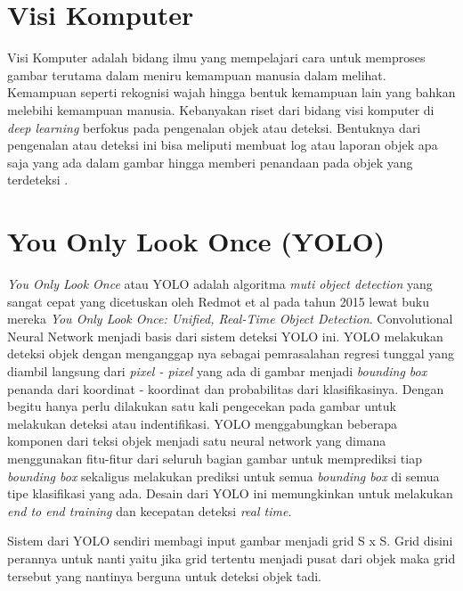 

\section{Visi Komputer}
\label{sec:visikomputer}

Visi Komputer adalah bidang ilmu yang mempelajari cara untuk memproses gambar terutama dalam meniru
kemampuan manusia dalam melihat. Kemampuan seperti rekognisi wajah hingga bentuk kemampuan lain yang bahkan
melebihi kemampuan manusia. Kebanyakan riset dari bidang visi komputer di \emph{deep learning} berfokus pada
pengenalan objek atau deteksi. Bentuknya dari pengenalan atau deteksi ini bisa meliputi membuat log atau laporan
objek apa saja yang ada dalam gambar hingga memberi penandaan pada objek yang terdeteksi \cite{Goodfellow-et-al-2016}. 

\section{You Only Look Once (YOLO)}
\label{sec:youonlylookone}

\emph{You Only Look Once} atau YOLO adalah algoritma \emph{muti object detection} yang sangat cepat yang dicetuskan oleh Redmot et al pada tahun 2015
lewat buku mereka \emph{You Only Look Once: Unified, Real-Time Object Detection}\cite{redmon2016you}. Convolutional Neural Network menjadi basis dari sistem deteksi YOLO ini.
YOLO melakukan deteksi objek dengan menganggap nya sebagai pemrasalahan regresi tunggal yang diambil langsung dari \emph{pixel - pixel} yang ada
di gambar menjadi \emph{bounding box} penanda dari koordinat - koordinat dan probabilitas dari klasifikasinya. Dengan begitu
hanya perlu dilakukan satu kali pengecekan pada gambar untuk melakukan deteksi atau indentifikasi. \cite{redmon2016you}
YOLO menggabungkan beberapa komponen dari teksi objek menjadi satu neural network yang dimana menggunakan fitu-fitur
dari seluruh bagian gambar untuk memprediksi tiap \emph{bounding box} sekaligus melakukan prediksi untuk semua
\emph{bounding box} di semua tipe klasifikasi yang ada. Desain dari YOLO ini memungkinkan untuk melakukan
\emph{end to end training} dan kecepatan deteksi \emph{real time}.

\par Sistem dari YOLO sendiri membagi input gambar menjadi grid S x S. Grid disini perannya untuk 
nanti yaitu jika grid tertentu menjadi pusat dari objek maka grid tersebut yang nantinya berguna untuk deteksi objek tadi.


